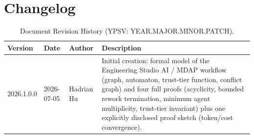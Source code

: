 \documentclass[12pt]{article}
\theoremstyle{definition}
\begin{document}
\section*{Changelog}
\label{sec:changelog}

\begin{table}[H]
\centering
\caption{Document Revision History (YPSV: YEAR.MAJOR.MINOR.PATCH).}
\begin{tabular}{@{}lllp{6.5cm}@{}}
\toprule
\textbf{Version} & \textbf{Date} & \textbf{Author} & \textbf{Description} \\
\midrule
2026.1.0.0 & 2026-07-05 & Hadrian Hu & Initial creation: formal model of the
Engineering Studio AI / MDAP workflow (graph, automaton, trust-tier
function, conflict graph) and four full proofs (acyclicity, bounded
rework termination, minimum agent multiplicity, trust-tier invariant) plus
one explicitly disclosed proof sketch (token/cost convergence). \\
\bottomrule
\end{tabular}
\end{table}
\end{document}
